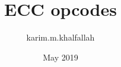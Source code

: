 \documentclass[12pt]{article}
\title{ECC opcodes}
\author{karim.m.khalfallah }
\date{May 2019}
\begin{document}
\begin{flushleft}

\footnotesize
\ttfamily



\end{flushleft}
\end{document}
